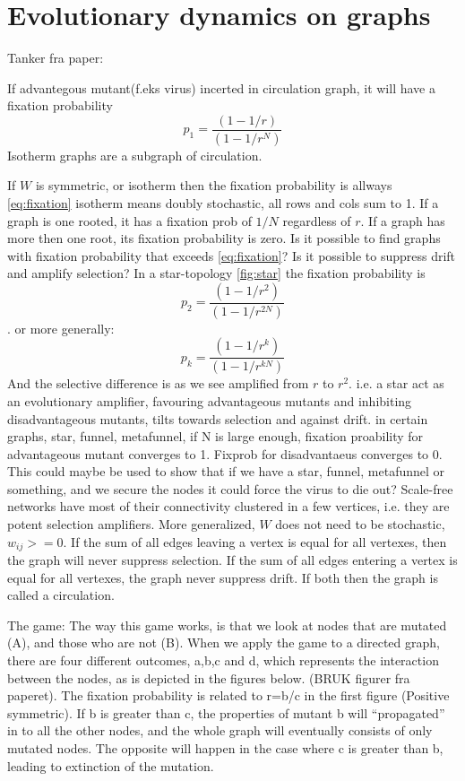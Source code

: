 \chapter{Evolutionary dynamics on graphs}
\label{chp:nature} 
\cite{lieberman2005evolutionary}
Tanker fra paper:

If advantegous mutant(f.eks virus) incerted in circulation graph, it will have a fixation probability 
\begin{equation}  p_{1}=\frac{(1-1/r)}{(1-1/r^{N})} \label{eq:fixation} \end{equation}
Isotherm graphs are a subgraph of circulation. 

If $W$ is symmetric, or isotherm then the fixation probability is allways \ref{eq:fixation}
isotherm means doubly stochastic, all rows and cols sum to 1. 
If a graph is one rooted, it has a fixation prob of $1/N$ regardless of $r$. If a graph has more then one root, its fixation probability is zero. 
Is it possible to find graphs with fixation probability that exceeds \ref{eq:fixation}? Is it possible to suppress drift and amplify selection?
In a star-topology \ref{fig:star} the fixation probability is\begin{equation}p_{2}=\frac{(1-1/r^{2})}{(1-1/r^{2N})} \label{eq:fixation2} \end{equation}.
or more generally: \begin{equation}
p_{k}=\frac{(1-1/r^{k})}{(1-1/r^{kN})} \label{eq:fixationk}
\end{equation}
And the selective difference is as we see amplified from $r$ to $r^{2}$. i.e. a star act as an evolutionary amplifier,
 favouring advantageous mutants and inhibiting disadvantageous mutants, tilts towards selection and against drift.
 in certain graphs, star, funnel, metafunnel, if N is large enough, fixation proability for advantageous mutant converges to 1. Fixprob for disadvantaeus converges to 0.
This could maybe be used to show that if we have a star, funnel, metafunnel or something, and we secure the nodes it could force the virus to die out?
Scale-free networks have most of their connectivity clustered in a few vertices, i.e. they are potent selection amplifiers.
More generalized, $W$ does not need to be stochastic, $w_{ij}>=0$. 
If the sum of all edges leaving a vertex is equal for all vertexes, then the graph will never suppress selection.
If the sum of all edges entering a vertex is equal for all vertexes, the graph never suppress drift.
If both then the graph is called a circulation.
 
The game:
The way this game works, is that we look at nodes that are mutated (A), and those who are not (B). When we apply the game to a directed graph, there are four different outcomes, a,b,c and d, which represents the interaction between the nodes, as is depicted in the figures below. (BRUK figurer fra paperet). The fixation probability is related to r=b/c in the first figure (Positive symmetric). If b is greater than c, the properties of mutant b will “propagated” in to all the other nodes, and the whole graph will eventually consists of only mutated nodes. The opposite will happen in the case where c is greater than b, leading to extinction of the mutation. 


